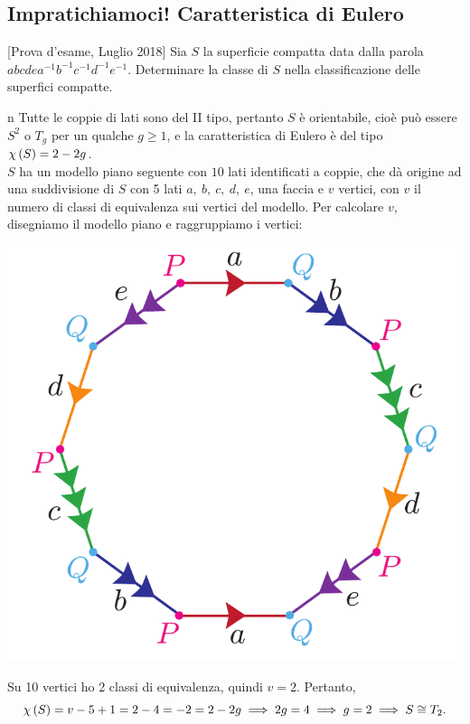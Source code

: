 \subsection{Impratichiamoci! Caratteristica di Eulero}
\begin{exercise}{}[Prova d'esame, Luglio 2018]
Sia $S$ la superficie compatta data dalla parola $abcdea^{-1}b^{-1}c^{-1}d^{-1}e^{-1}$. Determinare la classe di $S$ nella classificazione delle superfici compatte.
\end{exercise}
\begin{solution}{n}
	Tutte le coppie di lati sono del II tipo, pertanto $S$ è orientabile, cioè può essere $S^2$ o $T_g$ per un qualche $g\geq 1$, e la caratteristica di Eulero è del tipo $\euler{S}{\ }=2-2g$.\\
	$S$ ha un modello piano seguente con $10$ lati identificati a coppie, che dà origine ad una suddivisione di $S$ con 5 lati $a,\ b,\ c,\ d,\ e$, una faccia e $v$ vertici, con $v$ il numero di classi di equivalenza sui vertici del modello. Per calcolare $v$, disegniamo il modello piano e raggruppiamo i vertici:
	\begin{center}
		\includegraphics[trim=0cm 0cm 0cm 0cm, clip, scale=0.375]{images/modellopianoexercise.pdf}
	\end{center}
Su 10 vertici ho 2 classi di equivalenza, quindi $v=2$. Pertanto,
\begin{equation*}
	\euler{S}{\ }=v-5+1=2-4=-2=2-2g\implies 2g=4\implies g=2\implies S\cong T_2.
\end{equation*}
\end{solution}